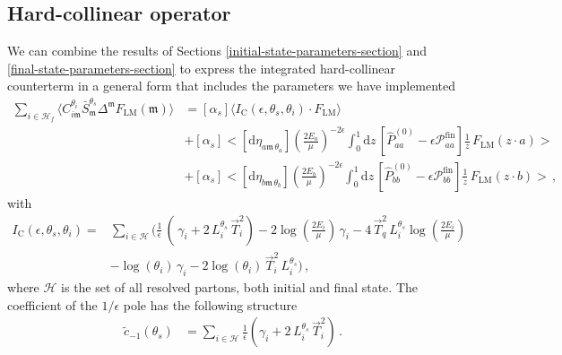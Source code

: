 \documentclass[a4paper, 12pt]{book}
\newcommand{\um}{\mathfrak{m}}
\begin{document}
\subsection{Hard-collinear operator}
We can combine the results of Sections \ref{initial-state-parameters-section} and \ref{final-state-parameters-section} to express the integrated hard-collinear counterterm in a general form that includes the parameters we have implemented
\begin{equation}
  \begin{aligned}
    \sum_{i \in \mathcal{H}_f} \langle C_{i\mathfrak{m}}^{\theta_i} \bar{S}_{\mathfrak{m}}^{\theta_s} \Delta^{\mathfrak{m}} F_{\mathrm{LM}}(\mathfrak{m})\rangle &= [\alpha_s]\langle I_{\mathrm{C}}(\epsilon, \theta_s, \theta_i) \cdot F_{\mathrm{LM}} \rangle \\
    & + [\alpha_s] \bigl< [\mathrm{d}\eta_{a\um \, \theta_a}] \left(\frac{2E_a}{\mu}\right)^{-2\epsilon} \int_{0}^{1} \mathrm{d}z \, \left[\hat{P}_{aa}^{(0)}-\epsilon \mathcal{P}_{aa}^{\mathrm{fin}}\right] \frac{1}{z} \, F_{\mathrm{LM}}(z\cdot a) \bigr> \\
    & + [\alpha_s] \bigl< [\mathrm{d}\eta_{b\um \, \theta_b}] \left(\frac{2E_b}{\mu}\right)^{-2\epsilon} \int_{0}^{1} \mathrm{d}z \, \left[\hat{P}_{bb}^{(0)}-\epsilon \mathcal{P}_{bb}^{\mathrm{fin}}\right] \frac{1}{z} \, F_{\mathrm{LM}}(z\cdot b) \bigr> \, ,
  \end{aligned}
\end{equation}
with
\begin{equation}
  \begin{aligned}
    I_{\mathrm{C}} (\epsilon, \theta_s, \theta_i) = &\sum_{i \in \mathcal{H}} \Biggl( \frac{1}{\epsilon}\, \left(\, \gamma_i+  2 \,L_i^{\theta_s} \,\vec{T}_i^2 \right) - 2 \log{\left(\frac{2E_i}{\mu}\right)}\, \gamma_i  - 4 \, \vec{T}_q^2 \, L_i^{\theta_s} \log{\left(\frac{2E_i}{\mu}\right)} \\
    & - \log{(\theta_i)} \, \gamma_i - 2 \log{(\theta_i)} \, \vec{T}_i^2 \, L_i^{\theta_s} \Biggr) \, ,
    \label{green}
  \end{aligned}
\end{equation}
where $\mathcal{H}$ is the set of all resolved partons, both initial and final state. The coefficient of the $1/\epsilon$ pole has the following structure
\begin{equation}
  \begin{aligned}
  \tilde{c}_{-1}(\theta_s) & = \sum_{i \in \mathcal{H}} \frac{1}{\epsilon} \left( \gamma_i + 2 \, L_i^{\theta_s} \, \vec{T}_i^2 \right) \, .
  \label{coefficient-collinear}
  \end{aligned}
\end{equation}
\end{document}
